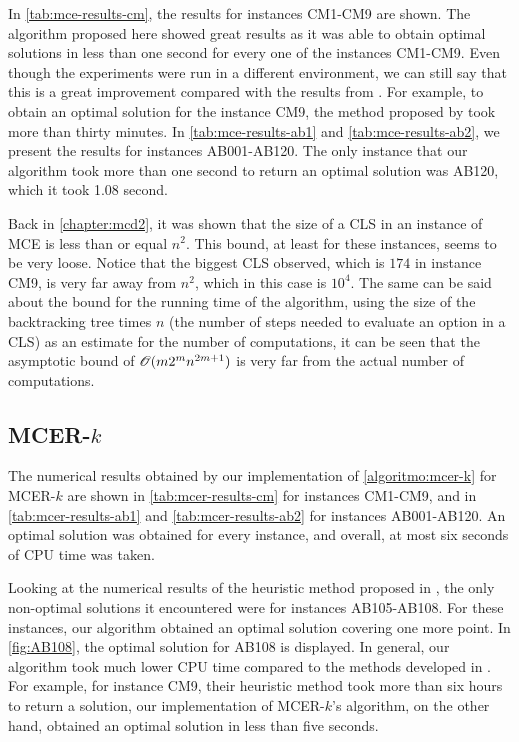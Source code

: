 In \autoref{tab:mce-results-cm}, the results for instances CM1-CM9 are shown. 
The algorithm proposed here showed great results as it was able to obtain optimal solutions in less than one second for every one of the instances CM1-CM9.
Even though the experiments were run in a different environment, we can still say that this is a great improvement compared with the results from . For example, to obtain an optimal solution for the instance CM9, the method proposed by  took more than thirty minutes.
In \autoref{tab:mce-results-ab1} and \autoref{tab:mce-results-ab2}, we present the results for instances AB001-AB120. The only instance that our algorithm took more than one second to return an optimal solution was AB120, which it took 1.08 second.

Back in \autoref{chapter:mcd2}, it was shown that the size of a CLS in an instance of MCE is less than or equal $n^2$. This bound, at least for these instances, seems to be very loose. Notice that the biggest CLS observed, which is $174$ in instance CM9, is very far away from $n^2$, which in this case is $10^4$.
The same can be said about the bound for the running time of the algorithm, using the size of the backtracking tree times $n$ (the number of steps needed to evaluate an option in a CLS) as an estimate for the number of computations, it can be seen that the asymptotic bound of $\mathscr{O}(m2^mn^{2m+1})$ is very far from the actual number of computations.

\subsection{MCER-$k$}

The numerical results obtained by our implementation of \autoref{algoritmo:mcer-k} for MCER-$k$ are shown in \autoref{tab:mcer-results-cm} for instances CM1-CM9, and in \autoref{tab:mcer-results-ab1} and \autoref{tab:mcer-results-ab2} for instances AB001-AB120. 
An optimal solution was obtained for every instance, and overall, at most six seconds of CPU time was taken.

Looking at the numerical results of the heuristic method proposed in , the only non-optimal solutions it encountered were for instances AB105-AB108. For these instances, our algorithm obtained an optimal solution covering one more point. In \autoref{fig:AB108}, the optimal solution for AB108 is displayed.
In general, our algorithm took much lower CPU time compared to the methods developed in . For example, for instance CM9, their heuristic method took more than six hours to return a solution, our implementation of MCER-$k$'s algorithm, on the other hand, obtained an optimal solution in less than five seconds.

